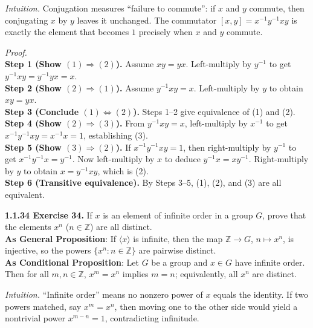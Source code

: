 \documentclass[12pt]{article}
\theoremstyle{definition}
\begin{document}
\newpage

\dotfill

\emph{Intuition.} Conjugation measures “failure to commute”: if $x$ and $y$ commute, then conjugating $x$ by $y$ leaves it unchanged. The commutator $[x,y]=x^{-1}y^{-1}xy$ is exactly the element that becomes $1$ precisely when $x$ and $y$ commute.\\

\dotfill

\emph{Proof.}\\
\textbf{Step 1 (Show $(1)\Rightarrow(2)$).} Assume $xy=yx$. Left-multiply by $y^{-1}$ to get $y^{-1}xy=y^{-1}yx=x$.\\
\textbf{Step 2 (Show $(2)\Rightarrow(1)$).} Assume $y^{-1}xy=x$. Left-multiply by $y$ to obtain $xy=yx$.\\
\textbf{Step 3 (Conclude $(1)\Leftrightarrow(2)$).} Steps 1–2 give equivalence of (1) and (2).\\
\textbf{Step 4 (Show $(2)\Rightarrow(3)$).} From $y^{-1}xy=x$, left-multiply by $x^{-1}$ to get $x^{-1}y^{-1}xy=x^{-1}x=1$, establishing (3).\\
\textbf{Step 5 (Show $(3)\Rightarrow(2)$).} If $x^{-1}y^{-1}xy=1$, then right-multiply by $y^{-1}$ to get $x^{-1}y^{-1}x= y^{-1}$. Now left-multiply by $x$ to deduce $y^{-1}x=xy^{-1}$. Right-multiply by $y$ to obtain $x= y^{-1}xy$, which is (2).\\
\textbf{Step 6 (Transitive equivalence).} By Steps 3–5, (1), (2), and (3) are all equivalent.

\newpage

\noindent \textbf{1.1.34 Exercise 34.} If $x$ is an element of infinite order in a group $G$, prove that the elements $x^n$ ($n\in\mathbb{Z}$) are all distinct.\\ %

\noindent\textbf{As General Proposition}: If $\langle x\rangle$ is infinite, then the map $\mathbb{Z}\to G$, $n\mapsto x^n$, is injective, so the powers $\{x^n:n\in\mathbb{Z}\}$ are pairwise distinct.\\

\noindent \textbf{As Conditional Proposition}: Let $G$ be a group and $x\in G$ have infinite order. Then for all $m,n\in\mathbb{Z}$, $x^m=x^n$ implies $m=n$; equivalently, all $x^n$ are distinct.\\

\newpage

\dotfill

\emph{Intuition.} “Infinite order” means no nonzero power of $x$ equals the identity. If two powers matched, say $x^m=x^n$, then moving one to the other side would yield a nontrivial power $x^{m-n}=1$, contradicting infinitude.\\
\end{document}
